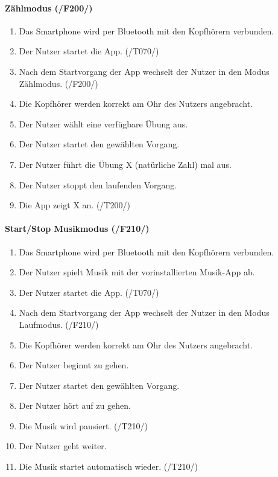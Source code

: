 \documentclass[a4paper,12pt]{article}
\begin{document}
    
    \paragraph{Zählmodus (/F200/)}
      \begin{enumerate}
        \item Das Smartphone wird per Bluetooth mit den Kopfhörern verbunden.
        \item Der Nutzer startet die App. (/T070/)
        \item Nach dem Startvorgang der App wechselt der Nutzer in den Modus \glqq Zählmodus\grqq . (/F200/)
        \item Die Kopfhörer werden korrekt am Ohr des Nutzers angebracht.
        \item Der Nutzer wählt eine verfügbare Übung aus. 
        \item Der Nutzer startet den gewählten \Gls{Vorgang}.
        \item Der Nutzer führt die Übung X (natürliche Zahl) mal aus.
        \item Der Nutzer stoppt den laufenden \Gls{Vorgang}.
        \item Die App zeigt X an. (/T200/)
      \end{enumerate}

    
    \paragraph{Start/Stop Musikmodus (/F210/)}
      \begin{enumerate}
        \item Das Smartphone wird per Bluetooth mit den Kopfhörern verbunden.
        \item Der Nutzer spielt Musik mit der vorinstallierten Musik-App ab.
        \item Der Nutzer startet die App. (/T070/)
        \item Nach dem Startvorgang der App wechselt der Nutzer in den Modus \glqq Laufmodus\grqq . (/F210/)
        \item Die Kopfhörer werden korrekt am Ohr des Nutzers angebracht.
        \item Der Nutzer beginnt zu gehen.
        \item Der Nutzer startet den gewählten \Gls{Vorgang}.
        \item Der Nutzer hört auf zu gehen.
        \item Die Musik wird pausiert. (/T210/)
        \item Der Nutzer geht weiter.
        \item Die Musik startet automatisch wieder. (/T210/)
      \end{enumerate}
  
\end{document}
